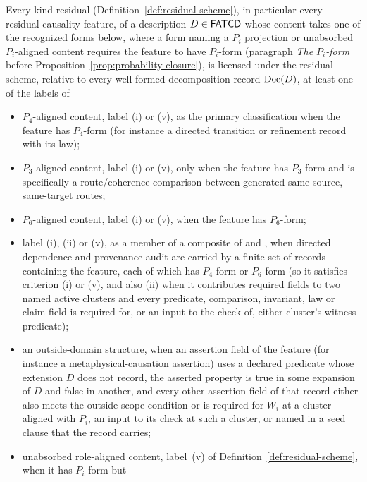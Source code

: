 \begin{proposition}\label{prop:causality-closure}
Every kind residual (Definition~\ref{def:residual-scheme}), in particular every residual-causality feature, of a description
\(D \in \mathsf{FATCD}{}\) whose content takes one of the recognized forms below,
where a form naming a \(P_i\) projection or unabsorbed \(P_i\)-aligned content
requires the feature to have \(P_i\)-form (paragraph \emph{The \(P_i\)-form}
before Proposition~\ref{prop:probability-closure}),
is licensed under the residual scheme, relative to every well-formed
decomposition record \(\operatorname{Dec}\!\left(D\right)\), at least one of the labels of
\begin{itemize}[topsep=2pt,itemsep=1pt]
  \item \(P_4\)-aligned content, label (i) or (v), as the primary classification when the
    feature has \(P_4\)-form (for instance a directed transition or
    refinement record with its law);
  \item \(P_3\)-aligned content, label (i) or (v), only when the feature has \(P_3\)-form and is specifically a
    route/coherence comparison between generated same-source,
    same-target routes;
  \item \(P_6\)-aligned content, label (i) or (v), when the feature has \(P_6\)-form;
  \item label (i), (ii) or (v), as a member of a composite of \Pfour{} and
    \Psix{}, when directed dependence and provenance audit are carried by a
    finite set of records containing the feature, each of which has
    \(P_4\)-form or \(P_6\)-form (so it satisfies criterion (i) or (v), and also (ii)
    when it contributes required fields to two named active clusters and every
    predicate, comparison, invariant, law or claim field is required for, or an
    input to the check of, either cluster's witness predicate);
  \item an outside-domain structure, when an assertion field of the feature (for instance a
    metaphysical-causation assertion) uses a declared predicate whose extension \(D\) does not record, the asserted property is true in some expansion of \(D\) and false in another, and every other assertion field of that record either also meets the outside-scope condition or is required for \(W_i\) at a cluster aligned with \(P_i\), an input to its check at such a cluster, or named in a seed clause that the record carries;
  \item unabsorbed role-aligned content, label~(v) of
    Definition~\ref{def:residual-scheme}, when it has \(P_i\)-form but

\end{itemize}
\end{proposition}
